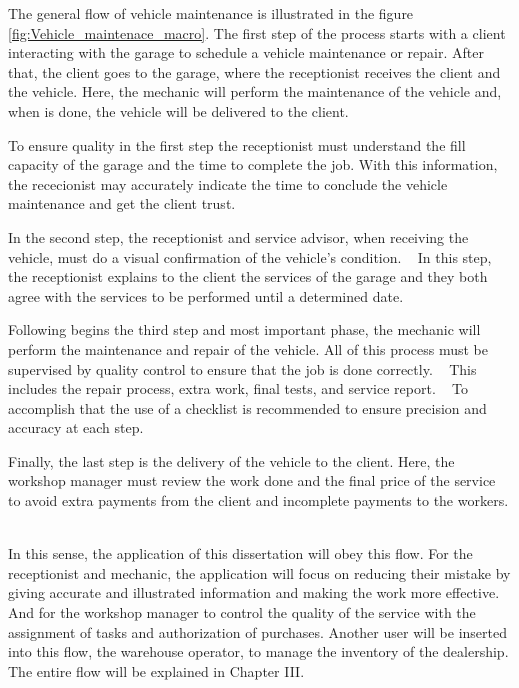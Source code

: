 The general flow of vehicle maintenance is illustrated in the figure \ref{fig:Vehicle_maintenace_macro}. 
The first step of the process starts with a client interacting with the garage to schedule a vehicle maintenance or repair. 
After that, the client goes to the garage, where the receptionist receives the client and the vehicle.
Here, the mechanic will perform the maintenance of the vehicle and, when is done, the vehicle will be delivered to the client.

To ensure quality in the first step the receptionist must understand the fill capacity of the garage and the time to complete the job. 
With this information, the rececionist may accurately indicate the time to conclude the vehicle maintenance and get the client trust. ~\cite{Setting_the_after_sale_process}

In the second step, the receptionist and service advisor, when receiving the vehicle, must do a visual confirmation of the vehicle's condition. ~\cite{Setting_the_after_sale_process}
In this step, the receptionist explains to the client the services of the garage and they both agree with the services to be performed until a determined date. ~\cite{Setting_the_after_sale_process}

Following begins the third step and most important phase, the mechanic will perform the maintenance and repair of the vehicle. 
All of this process must be supervised by quality control to ensure that the job is done correctly. ~\cite{Setting_the_after_sale_process}
This includes the repair process, extra work, final tests, and service report. ~\cite{Setting_the_after_sale_process}
To accomplish that the use of a checklist is recommended to ensure precision and accuracy at each step. ~\cite{Setting_the_after_sale_process}

Finally, the last step is the delivery of the vehicle to the client. 
Here, the workshop manager must review the work done and the final price of the service to avoid extra payments from the client and incomplete payments to the workers. ~\cite{Setting_the_after_sale_process}

In this sense, the application of this dissertation will obey this flow.
For the receptionist and mechanic, the application will focus on reducing their mistake by giving accurate and illustrated information and making the work more effective.
And for the workshop manager to control the quality of the service with the assignment of tasks and authorization of purchases. 
Another user will be inserted into this flow, the warehouse operator, to manage the inventory of the dealership. 
The entire flow will be explained in Chapter III. 


